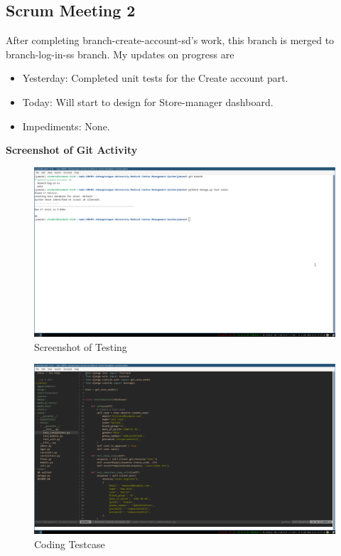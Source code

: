 \documentclass[a4paper,12pt]{article}
\begin{document}
\subsection{Scrum Meeting 2}
After completing branch-create-account-sd's work, this branch is merged to branch-log-in-ss branch.
My updates on progress are
\begin{itemize}
    \item Yesterday: Completed unit tests for the Create account part.
    \item Today: Will start to design for Store-manager dashboard.
    \item Impediments: None.
\end{itemize}
\textbf{\large{Screenshot of Git Activity}}
\begin{figure}[H]
    \centering
    \includegraphics[width=\textwidth]{images/spr1meet21.png}
    \caption{Screenshot of Testing}
\end{figure}
\begin{figure}[H]
    \centering
    \includegraphics[width=\textwidth]{images/spr1meet22.png}
    \caption{Coding Testcase}
\end{figure}
\newpage
\end{document}
